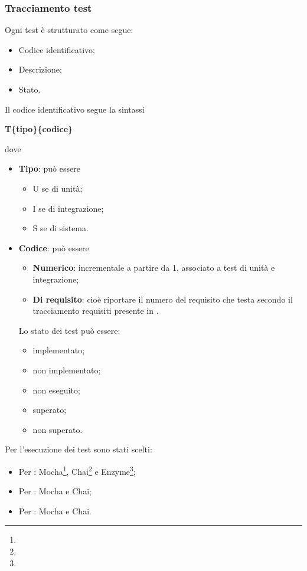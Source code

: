 \documentclass[NormeDiProgetto.tex]{subfiles}
\begin{document}
	\subsubsection{Tracciamento test}
	Ogni test è strutturato come segue:
	\begin{itemize}
		\item Codice identificativo;
		\item Descrizione;
		\item Stato.
	\end{itemize}
	Il codice identificativo segue la sintassi 
	\begin{center}
		\textbf{T\{tipo\}\{codice\}}
	\end{center}
dove 
\begin{itemize}
	\item \textbf{Tipo}: può essere 
	\begin{itemize}
		\item U se di unità;
		\item I se di integrazione;
		\item S se di sistema.
	\end{itemize}
	\item \textbf{Codice}: può essere 
	\begin{itemize}
		\item \textbf{Numerico}: incrementale a partire da 1, associato a test di unità e integrazione;
		\item \textbf{Di requisito}: cioè riportare il numero del requisito che testa secondo il tracciamento requisiti presente in \adr \vrquattro.
	\end{itemize}

Lo stato dei test può essere:
\begin{itemize}
	\item implementato;
	\item non implementato;
	\item non eseguito;
	\item superato;
	\item non superato.
\end{itemize}
\end{itemize}
	Per l'esecuzione dei test sono stati scelti:
	\begin{itemize}
		\item Per : Mocha\footnote{}, Chai\footnote{} e Enzyme\footnote{};
		\item Per : Mocha e Chai;
		\item Per : Mocha e Chai.
	\end{itemize}
	
\end{document}
